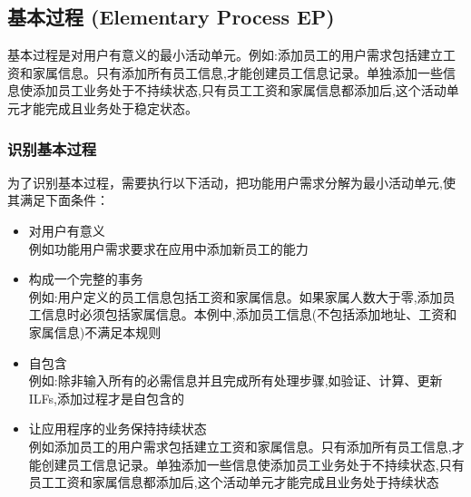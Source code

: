 
\hypertarget{ux57faux672cux8fc7ux7a0b-elementary-process-ep}{%
\subsection{基本过程 (Elementary Process
EP)}\label{ux57faux672cux8fc7ux7a0b-elementary-process-ep}}

基本过程是对用户有意义的最小活动单元。例如:添加员工的用户需求包括建立工资和家属信息。只有添加所有员工信息,才能创建员工信息记录。单独添加一些信息使添加员工业务处于不持续状态,只有员工工资和家属信息都添加后,这个活动单元才能完成且业务处于稳定状态。

\hypertarget{ux8bc6ux522bux57faux672cux8fc7ux7a0b}{%
\subsubsection{识别基本过程}\label{ux8bc6ux522bux57faux672cux8fc7ux7a0b}}

为了识别基本过程，需要执行以下活动，把功能用户需求分解为最小活动单元,使其满足下面条件：

\begin{itemize}
\tightlist
\item
  对用户有意义\\
  例如功能用户需求要求在应用中添加新员工的能力
\item
  构成一个完整的事务\\
  例如:用户定义的员工信息包括工资和家属信息。如果家属人数大于零,添加员工信息时必须包括家属信息。本例中,添加员工信息(不包括添加地址、工资和家属信息)不满足本规则
\item
  自包含\\
  例如:除非输入所有的必需信息并且完成所有处理步骤,如验证、计算、更新ILFs,添加过程才是自包含的
\item
  让应用程序的业务保持持续状态\\
  例如添加员工的用户需求包括建立工资和家属信息。只有添加所有员工信息,才能创建员工信息记录。单独添加一些信息使添加员工业务处于不持续状态,只有员工工资和家属信息都添加后,这个活动单元才能完成且业务处于持续状态\\
\end{itemize}

